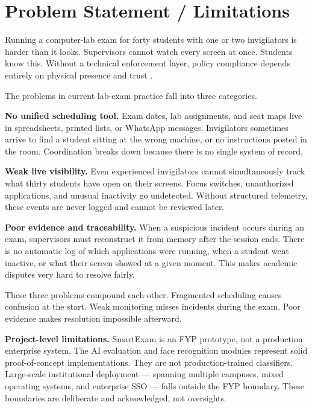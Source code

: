 \section{Problem Statement / Limitations}

Running a computer-lab exam for forty students with one or two invigilators is harder than it looks. Supervisors cannot watch every screen at once. Students know this. Without a technical enforcement layer, policy compliance depends entirely on physical presence and trust \cite{mit_cbt}.

The problems in current lab-exam practice fall into three categories.

\textbf{No unified scheduling tool.} Exam dates, lab assignments, and seat maps live in spreadsheets, printed lists, or WhatsApp messages. Invigilators sometimes arrive to find a student sitting at the wrong machine, or no instructions posted in the room. Coordination breaks down because there is no single system of record.

\textbf{Weak live visibility.} Even experienced invigilators cannot simultaneously track what thirty students have open on their screens. Focus switches, unauthorized applications, and unusual inactivity go undetected. Without structured telemetry, these events are never logged and cannot be reviewed later.

\textbf{Poor evidence and traceability.} When a suspicious incident occurs during an exam, supervisors must reconstruct it from memory after the session ends. There is no automatic log of which applications were running, when a student went inactive, or what their screen showed at a given moment. This makes academic disputes very hard to resolve fairly.

These three problems compound each other. Fragmented scheduling causes confusion at the start. Weak monitoring misses incidents during the exam. Poor evidence makes resolution impossible afterward.

\textbf{Project-level limitations.} SmartExam is an FYP prototype, not a production enterprise system. The AI evaluation and face recognition modules represent solid proof-of-concept implementations. They are not production-trained classifiers. Large-scale institutional deployment — spanning multiple campuses, mixed operating systems, and enterprise SSO — falls outside the FYP boundary. These boundaries are deliberate and acknowledged, not oversights.
